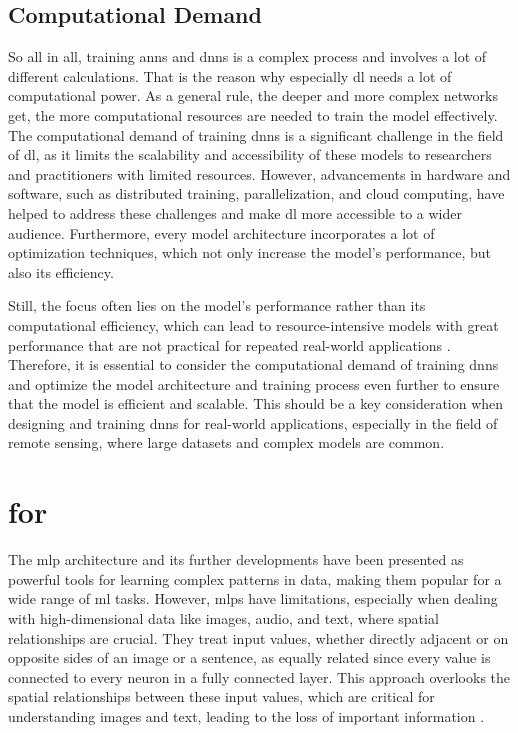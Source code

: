 \subsection{Computational Demand}

So all in all, training \glspl{ann} and \glspl{dnn} is a complex process and involves a lot of different calculations. That is the reason why especially \gls{dl} needs a lot of computational power. As a general rule, the deeper and more complex networks get, the more computational resources are needed to train the model effectively. The computational demand of training \glspl{dnn} is a significant challenge in the field of \gls{dl}, as it limits the scalability and accessibility of these models to researchers and practitioners with limited resources. However, advancements in hardware and software, such as distributed training, parallelization, and cloud computing, have helped to address these challenges and make \gls{dl} more accessible to a wider audience. Furthermore, every model architecture incorporates a lot of optimization techniques, which not only increase the model's performance, but also its efficiency.

Still, the focus often lies on the model's performance rather than its computational efficiency, which can lead to resource-intensive models with great performance that are not practical for repeated real-world applications \autocite{Getzner.Charpentier.ea2023,Lazzaro.Cina.ea2023,Mehlin.Schacht.ea2023,Thompson.Greenewald.ea2022}. Therefore, it is essential to consider the computational demand of training \glspl{dnn} and optimize the model architecture and training process even further to ensure that the model is efficient and scalable. This should be a key consideration when designing and training \glspl{dnn} for real-world applications, especially in the field of remote sensing, where large datasets and complex models are common.

\section{ for }

The \gls{mlp} architecture and its further developments have been presented as powerful tools for learning complex patterns in data, making them popular for a wide range of \gls{ml} tasks. However, \glspl{mlp} have limitations, especially when dealing with high-dimensional data like images, audio, and text, where spatial relationships are crucial. They treat input values, whether directly adjacent or on opposite sides of an image or a sentence, as equally related since every value is connected to every neuron in a fully connected layer. This approach overlooks the spatial relationships between these input values, which are critical for understanding images and text, leading to the loss of important information \autocite{Nielsen2015}.

